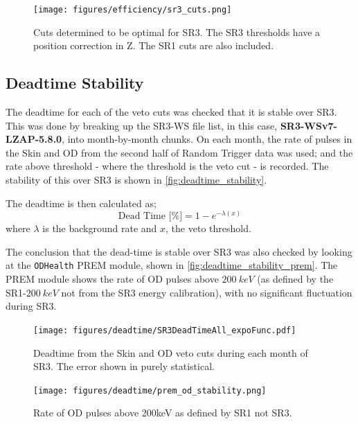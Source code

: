 \begin{figure}
    \centering
    \texttt{[image: figures/efficiency/sr3\_cuts.png]}
    \caption{Cuts determined to be optimal for SR3. 
    The SR3 thresholds have a position correction in Z. The SR1 cuts are also included.}
    \label{fig:sr3_veto_cuts}
\end{figure}

\subsection{Deadtime Stability}

The deadtime for each of the veto cuts was checked that it is stable over SR3.
This was done by breaking up the SR3-WS file list, in this case, \textbf{SR3-WSv7-LZAP-5.8.0}, into month-by-month chunks.
On each month, the rate of pulses in the Skin and OD from the second half of Random Trigger data was used; and the rate above threshold - where the threshold is the veto cut - is recorded. The stability of this over SR3 is shown in \autoref{fig:deadtime_stability}.

The deadtime is then calculated as;
\begin{equation}
    \textrm{Dead Time [\%]} = 1 - e^{-\lambda (x)}
\end{equation}
where $\lambda$ is the background rate and $x$, the veto threshold.

The conclusion that the dead-time is stable over SR3 was also checked by looking at the \lstinline{ODHealth} PREM module, shown in \autoref{fig:deadtime_stability_prem}.
The PREM module shows the rate of OD pulses above $200~keV$ (as defined by the SR1-$200~keV$ not from the SR3 energy calibration), with no significant fluctuation during SR3.
\begin{figure}
    \centering
    \texttt{[image: figures/deadtime/SR3DeadTimeAll\_expoFunc.pdf]}
    \caption{Deadtime from the Skin and OD veto cuts during each month of SR3. The error shown in purely statistical.}
    \label{fig:deadtime_stability}
\end{figure}
\begin{figure}
    \centering
    \texttt{[image: figures/deadtime/prem\_od\_stability.png]}
    \caption{Rate of OD pulses above 200keV as defined by SR1 not SR3.}
    \label{fig:deadtime_stability_prem}
\end{figure}


